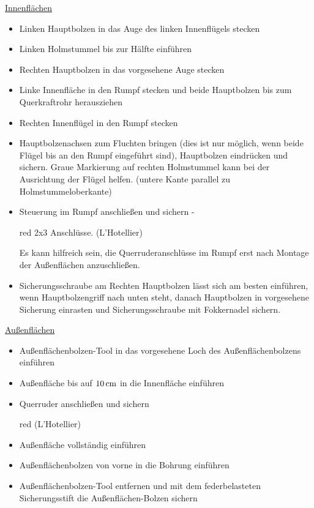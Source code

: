 \underline{Innenflächen}
\begin{itemize}
\item Linken Hauptbolzen in das Auge des linken Innenflügels stecken
\item Linken Holmstummel bis zur Hälfte einführen
\item Rechten Hauptbolzen in das vorgesehene Auge stecken
\item Linke Innenfläche in den Rumpf stecken und beide Hauptbolzen bis zum Querkraftrohr herausziehen
\item Rechten Innenflügel in den Rumpf stecken
\item Hauptbolzenachsen zum Fluchten bringen (dies ist nur möglich, wenn beide Flügel bis an den Rumpf eingeführt sind), Hauptbolzen eindrücken und sichern. Graue Markierung auf rechten Holmstummel kann bei der Ausrichtung der Flügel helfen. (untere Kante parallel zu Holmstummeloberkante)
\item Steuerung im Rumpf anschließen und sichern - \begin{color}{red} 2x3 Anschlüsse. (L'Hotellier) \end{color} Es kann hilfreich sein, die Querruderanschlüsse im Rumpf erst nach Montage der Außenflächen anzuschließen.
\item Sicherungsschraube am Rechten Hauptbolzen lässt sich am besten einführen, wenn Hauptbolzengriff nach unten steht, danach Hauptbolzen in vorgesehene Sicherung einrasten und Sicherungsschraube mit Fokkernadel sichern.
\end{itemize}

\underline{Außenflächen}
\begin{itemize}
\item Außenflächenbolzen-Tool in das vorgesehene Loch des Außenflächenbolzens einführen
\item Außenfläche bis auf $\unit[10]{cm}$ in die Innenfläche einführen
\item Querruder anschließen und sichern \begin{color}{red} (L'Hotellier) \end{color}
\item Außenfläche vollständig einführen
\item Außenflächenbolzen von vorne in die Bohrung einführen
\item Außenflächenbolzen-Tool entfernen und mit dem federbelasteten Sicherungsstift die Außenflächen-Bolzen sichern 
\end{itemize}

